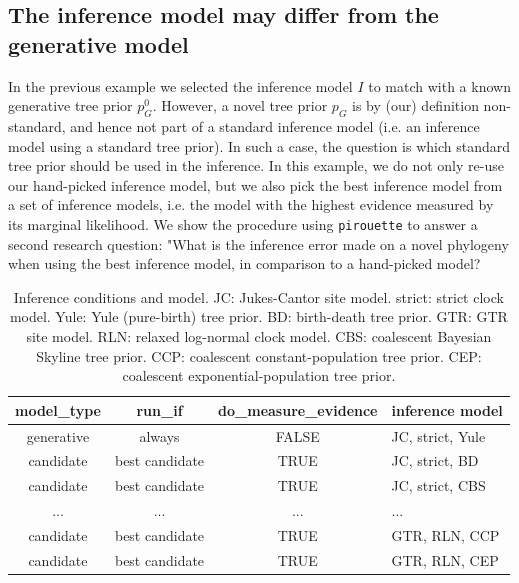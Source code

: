 \subsection{The inference model may differ from the generative model}

In the previous example we selected the inference model $\mathit{I}$ to match 
with a known generative tree prior $\mathit{p_{G}^0}$.
However, a novel tree prior $\mathit{p_{G}}$ is by (our) definition
non-standard, and hence not part of a standard inference 
model (i.e. an inference model using a standard tree prior).
In such a case, the question is which standard tree prior should be used in 
the inference. In this example, we do not only re-use our hand-picked 
inference model, but we also pick the best inference model from a set of 
inference models, i.e.  the model with 
the highest evidence measured by its marginal likelihood. 
We show the procedure using \verb;pirouette; to answer a second 
research question: "What is the inference error made on a novel phylogeny 
when using the best inference model, in comparison to a hand-picked model?

\begin{table}
  \begin{tabular}{ | c | c | c | l | }
    \hline
    \textbf{model\_type} &
    \textbf{run\_if} &
    \textbf{do\_measure\_evidence} & 
    \textbf{inference model} \\ 
    \hline
    generative & always         & FALSE & JC, strict, Yule \\
    candidate  & best candidate & TRUE  & JC, strict, BD   \\
    candidate  & best candidate & TRUE  & JC, strict, CBS  \\
    ...        & ...            & ...   & ...              \\
    candidate  & best candidate & TRUE  & GTR, RLN, CCP    \\
    candidate  & best candidate & TRUE  & GTR, RLN, CEP    \\
    \hline
  \end{tabular}
  \caption{
    Inference conditions and model.
    JC: Jukes-Cantor site model.
    strict: strict clock model.
    Yule: Yule (pure-birth) tree prior.
    BD: birth-death tree prior.
    GTR: GTR site model.
    RLN: relaxed log-normal clock model.
    CBS: coalescent Bayesian Skyline tree prior.
    CCP: coalescent constant-population tree prior.
    CEP: coalescent exponential-population tree prior.
  }
  \label{tab:RQ2}
\end{table}

